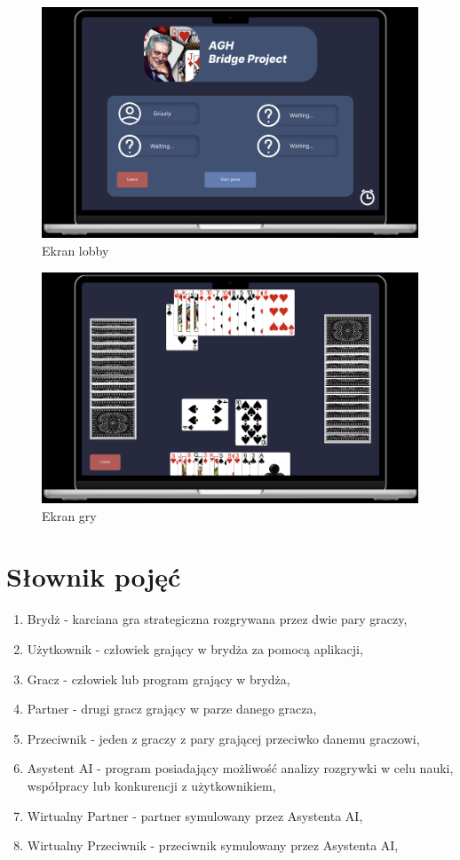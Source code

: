 \begin{figure}[h]
  \centering
  \includegraphics[width=\textwidth]{img/figma-szkic/3.png}
  \caption{Ekran lobby}
\end{figure}

\begin{figure}[h]
  \centering
  \includegraphics[width=\textwidth]{img/figma-szkic/4.png}
  \caption{Ekran gry}
\end{figure}

\FloatBarrier


\section{Słownik pojęć}

\begin{enumerate}
  \item Brydż - karciana gra strategiczna rozgrywana przez dwie pary graczy,
  \item Użytkownik - człowiek grający w brydża za pomocą aplikacji,
  \item Gracz - człowiek lub program grający w brydża,
  \item Partner - drugi gracz grający w parze danego gracza,
  \item Przeciwnik - jeden z graczy z pary grającej przeciwko danemu graczowi,
  \item Asystent AI - program posiadający możliwość analizy rozgrywki w celu nauki, współpracy lub konkurencji z użytkownikiem,
  \item Wirtualny Partner - partner symulowany przez Asystenta AI,
  \item Wirtualny Przeciwnik - przeciwnik symulowany przez Asystenta AI,
\end{enumerate}